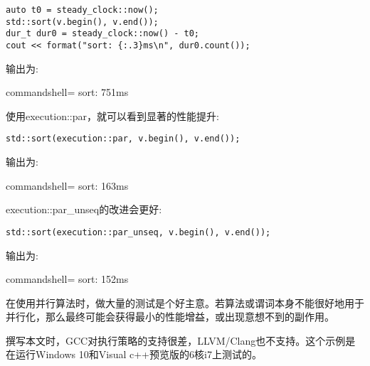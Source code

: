 \begin{lstlisting}[style=styleCXX]
auto t0 = steady_clock::now();
std::sort(v.begin(), v.end());
dur_t dur0 = steady_clock::now() - t0;
cout << format("sort: {:.3}ms\n", dur0.count());
\end{lstlisting}

输出为:

\begin{tcblisting}{commandshell={}}
sort: 751ms
\end{tcblisting}

使用execution::par，就可以看到显著的性能提升:

\begin{lstlisting}[style=styleCXX]
std::sort(execution::par, v.begin(), v.end());
\end{lstlisting}

输出为:

\begin{tcblisting}{commandshell={}}
sort: 163ms
\end{tcblisting}

execution::par\_unseq的改进会更好:

\begin{lstlisting}[style=styleCXX]
std::sort(execution::par_unseq, v.begin(), v.end());
\end{lstlisting}

输出为:

\begin{tcblisting}{commandshell={}}
sort: 152ms
\end{tcblisting}

在使用并行算法时，做大量的测试是个好主意。若算法或谓词本身不能很好地用于并行化，那么最终可能会获得最小的性能增益，或出现意想不到的副作用。

\begin{tcolorbox}[colback=webgreen!5!white,colframe=webgreen!75!black,title=Note]
撰写本文时，GCC对执行策略的支持很差，LLVM/Clang也不支持。这个示例是在运行Windows 10和Visual c++预览版的6核i7上测试的。
\end{tcolorbox}

















